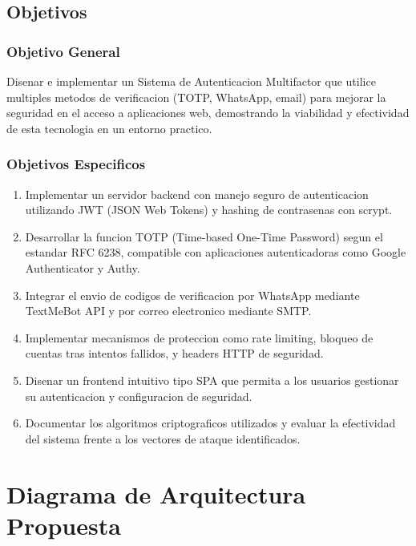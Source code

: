 \documentclass[12pt,a4paper]{article}
\begin{document}
\subsection{Objetivos}

\subsubsection{Objetivo General}

Disenar e implementar un Sistema de Autenticacion Multifactor que utilice multiples metodos de verificacion (TOTP, WhatsApp, email) para mejorar la seguridad en el acceso a aplicaciones web, demostrando la viabilidad y efectividad de esta tecnologia en un entorno practico.

\subsubsection{Objetivos Especificos}

\begin{enumerate}[leftmargin=*, itemsep=3pt]
    \item Implementar un servidor backend con manejo seguro de autenticacion utilizando JWT (JSON Web Tokens) y hashing de contrasenas con scrypt.
    \item Desarrollar la funcion TOTP (Time-based One-Time Password) segun el estandar RFC 6238, compatible con aplicaciones autenticadoras como Google Authenticator y Authy.
    \item Integrar el envio de codigos de verificacion por WhatsApp mediante TextMeBot API y por correo electronico mediante SMTP.
    \item Implementar mecanismos de proteccion como rate limiting, bloqueo de cuentas tras intentos fallidos, y headers HTTP de seguridad.
    \item Disenar un frontend intuitivo tipo SPA que permita a los usuarios gestionar su autenticacion y configuracion de seguridad.
    \item Documentar los algoritmos criptograficos utilizados y evaluar la efectividad del sistema frente a los vectores de ataque identificados.
\end{enumerate}

\section{Diagrama de Arquitectura Propuesta}
\end{document}
